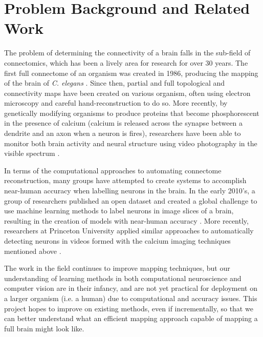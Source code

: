 \section{Problem Background and Related Work}


The problem of determining the connectivity of a brain falls in the sub-field of connectomics, which has been a lively area for research for over 30 years. The first full connectome of an organism was created in 1986, producing the mapping of the brain of \textit{C. elegans} \cite{White1986}. Since then, partial and full topological and connectivity maps have been created on various organism, often using electron microscopy and careful hand-reconstruction to do so. More recently, by genetically modifying organisms to produce proteins that become phosphorescent in the presence of calcium (calcium is released across the synapse between a dendrite and an axon when a neuron is fires), researchers have been able to monitor both brain activity and neural structure using video photography in the visible spectrum \cite{Nguyen2015}.

In terms of the computational approaches to automating connectome reconstruction, many groups have attempted to create systems to accomplish near-human accuracy when labelling neurons in the brain. In the early 2010's, a group of researchers published an open dataset and created a global challenge to use machine learning methods to label neurons in image slices of a brain, resulting in the creation of models with near-human accuracy \cite{Arganda-Carreras2015}. More recently, researchers at Princeton University applied similar approaches to automatically detecting neurons in videos formed with the calcium imaging techniques mentioned above \cite{Apthorpe2016}.

The work in the field continues to improve mapping techniques, but our understanding of learning methods in both computational neuroscience and computer vision are in their infancy, and are not yet practical for deployment on a larger organism (i.e. a human) due to computational and accuracy issues. This project hopes to improve on existing methods, even if incrementally, so that we can better understand what an efficient mapping approach capable of mapping a full brain might look like.